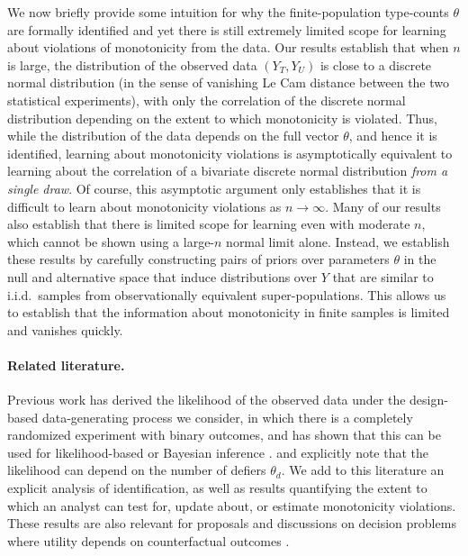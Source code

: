 \documentclass[12pt,reqno]{amsart}
\theoremstyle{theorem}
\theoremstyle{definition}
\newcommand{\0}{\mathbf{0}}
\newcommand{\1}{\mathbf{1}}
\begin{document}
We now briefly provide some intuition for why the finite-population type-counts $\theta$ are formally identified and yet there is still extremely limited scope for learning about violations of monotonicity from the data. Our results establish that when $n$ is large, the distribution of the observed data $(Y_T,Y_U)$ is close to a discrete normal distribution (in the sense of  vanishing Le Cam distance between the two statistical experiments), with only the correlation of the discrete normal distribution depending on the extent to which monotonicity is violated. Thus, while the distribution of the data depends on the full vector $\theta$, and hence it is identified, learning about monotonicity violations is asymptotically equivalent to learning about the correlation of a bivariate discrete normal distribution \emph{from a single draw}. Of course, this asymptotic argument only establishes that it is difficult to learn about monotonicity violations as $n \to \infty$. Many of our results also establish that there is limited scope for learning even with moderate $n$, which cannot be shown using a large-$n$ normal limit alone. Instead, we establish these results by carefully constructing pairs of priors over parameters $\theta$ in the null and alternative space that induce distributions over $Y$ that are similar to i.i.d.\ samples from observationally equivalent super-populations. This allows us to establish that the information about monotonicity in finite samples is limited and vanishes quickly.

\smallskip
\paragraph{\textbf{Related literature.}} Previous work has derived the likelihood of the
observed data under the design-based data-generating process we consider, in which there
is a completely randomized experiment with binary outcomes, and has shown that this can be
used for likelihood-based or Bayesian inference \citep{copas_randomization_1973,
ding_model-free_2019, christy_counting_2025}. \citet{copas_randomization_1973} and
\citet{christy_counting_2025} explicitly note that the likelihood can depend on the number
of defiers $\theta_d$. We add to this literature an explicit analysis of identification,
as well as results quantifying the extent to which an analyst can test for, update about, or estimate monotonicity violations. These results are also relevant for proposals and discussions on decision problems where utility depends on counterfactual outcomes \citep{ben2024policy, strzalecki2026hippocratic,koch2026axiomatic}.
\end{document}

